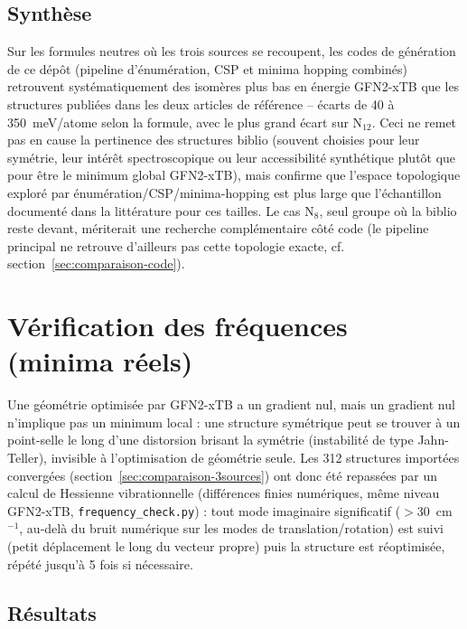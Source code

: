 \documentclass[11pt,a4paper]{article}
\begin{document}
\subsection{Synth\`ese}

Sur les formules neutres o\`u les trois sources se recoupent, les codes de
g\'en\'eration de ce d\'ep\^ot (pipeline d'\'enum\'eration, CSP et minima
hopping combin\'es) retrouvent syst\'ematiquement des isom\`eres plus bas
en \'energie GFN2-xTB que les structures publi\'ees dans les deux articles
de r\'ef\'erence -- \'ecarts de 40 \`a 350~meV/atome selon la formule, avec
le plus grand \'ecart sur N$_{12}$. Ceci ne remet pas en cause la
pertinence des structures biblio (souvent choisies pour leur sym\'etrie,
leur int\'er\^et spectroscopique ou leur accessibilit\'e synth\'etique
plut\^ot que pour \^etre le minimum global GFN2-xTB), mais confirme que
l'espace topologique explor\'e par \'enum\'eration/CSP/minima-hopping est
plus large que l'\'echantillon document\'e dans la litt\'erature pour ces
tailles. Le cas N$_8$, seul groupe o\`u la biblio reste devant, m\'eriterait
une recherche compl\'ementaire côt\'e code (le pipeline principal ne
retrouve d'ailleurs pas cette topologie exacte, cf.
section~\ref{sec:comparaison-code}).

\section{V\'erification des fr\'equences (minima r\'eels)}
\label{sec:freq-verif}

Une g\'eom\'etrie optimis\'ee par GFN2-xTB a un gradient nul, mais un
gradient nul n'implique pas un minimum local : une structure sym\'etrique
peut se trouver \`a un point-selle le long d'une distorsion brisant la
sym\'etrie (instabilit\'e de type Jahn-Teller), invisible \`a
l'optimisation de g\'eom\'etrie seule. Les 312 structures import\'ees
convergées (section~\ref{sec:comparaison-3sources}) ont donc \'et\'e
repass\'ees par un calcul de Hessienne vibrationnelle (diff\'erences finies
num\'eriques, m\^eme niveau GFN2-xTB, \texttt{frequency\_check.py}) : tout
mode imaginaire significatif ($>30$~cm$^{-1}$, au-del\`a du bruit num\'erique
sur les modes de translation/rotation) est suivi (petit d\'eplacement le
long du vecteur propre) puis la structure est r\'eoptimis\'ee, r\'ep\'et\'e
jusqu'\`a 5 fois si n\'ecessaire.

\subsection{R\'esultats}
\end{document}
